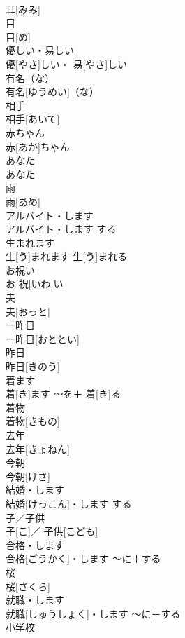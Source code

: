 \documentclass[8pt]{extreport}
\begin{document}
\begin{CJK}{UTF8}{min}
\\	耳[みみ]		
\\	目	
\\	目[め]		
\\	優しい・易しい	
\\	優[やさ]しい・ 易[やさ]しい		
\\	有名（な）	
\\	有名[ゆうめい]（な）		
\\	相手	
\\	相手[あいて]		
\\	赤ちゃん	
\\	赤[あか]ちゃん		
\\	あなた	
\\	あなた		
\\	雨	
\\	雨[あめ]		
\\	アルバイト・します	
\\	アルバイト・します	する	
\\	生まれます	
\\	生[う]まれます	生[う]まれる	
\\	お祝い	
\\	お 祝[いわ]い		
\\	夫	
\\	夫[おっと]		
\\	一昨日	
\\	一昨日[おととい]		
\\	昨日	
\\	昨日[きのう]		
\\	着ます	
\\	着[き]ます	〜を＋ 着[き]る	
\\	着物	
\\	着物[きもの]		
\\	去年	
\\	去年[きょねん]		
\\	今朝	
\\	今朝[けさ]		
\\	結婚・します	
\\	結婚[けっこん]・します	する	
\\	子／子供	
\\	子[こ]／ 子供[こども]		
\\	合格・します	
\\	合格[ごうかく]・します	〜に＋する	
\\	桜	
\\	桜[さくら]		
\\	就職・します	
\\	就職[しゅうしょく]・します	〜に＋する	
\\	小学校	

\end{CJK}
\end{document}

